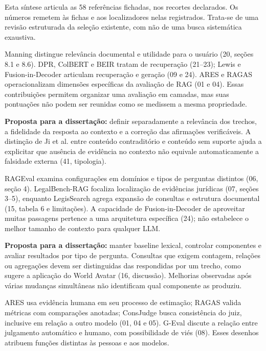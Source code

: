 Esta síntese articula as 58 referências fichadas, nos recortes declarados. Os números remetem às fichas e aos localizadores nelas registrados. Trata-se de uma revisão estruturada da seleção existente, com não de uma busca sistemática exaustiva.

Manning distingue relevância documental e utilidade para o usuário (20, seções 8.1 e 8.6). DPR, ColBERT e BEIR tratam de recuperação (21–23); Lewis e Fusion-in-Decoder articulam recuperação e geração (09 e 24). ARES e RAGAS operacionalizam dimensões específicas da avaliação de RAG (01 e 04). Essas contribuições permitem organizar uma avaliação em camadas, mas suas pontuações não podem ser reunidas como se medissem a mesma propriedade.

\textbf{Proposta para a dissertação:} definir separadamente a relevância dos trechos, a fidelidade da resposta ao contexto e a correção das afirmações verificáveis. A distinção de Ji et al. entre conteúdo contraditório e conteúdo sem suporte ajuda a explicitar que ausência de evidência no contexto não equivale automaticamente a falsidade externa (41, tipologia).

RAGEval examina configurações em domínios e tipos de perguntas distintos (06, seção 4). LegalBench-RAG focaliza localização de evidências jurídicas (07, seções 3–5), enquanto LegisSearch agrega expansão de consultas e estrutura documental (15, tabela 6 e limitações). A capacidade de Fusion-in-Decoder de aproveitar muitas passagens pertence a uma arquitetura específica (24); não estabelece o melhor tamanho de contexto para qualquer LLM.

\textbf{Proposta para a dissertação:} manter baseline lexical, controlar componentes e avaliar resultados por tipo de pergunta. Consultas que exigem contagem, relações ou agregações devem ser distinguidas das respondidas por um trecho, como sugere a aplicação do World Avatar (16, discussão). Melhorias observadas após várias mudanças simultâneas não identificam qual componente as produziu.

ARES usa evidência humana em seu processo de estimação; RAGAS valida métricas com comparações anotadas; ConsJudge busca consistência do juiz, inclusive em relação a outro modelo (01, 04 e 05). G-Eval discute a relação entre julgamento automático e humano, com possibilidade de viés (08). Esses desenhos atribuem funções distintas às pessoas e aos modelos.

